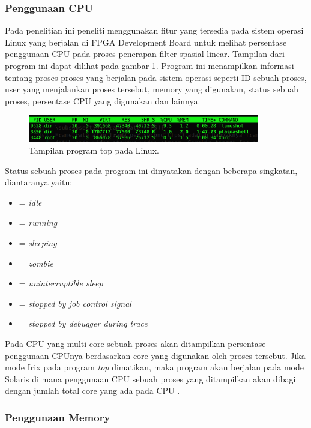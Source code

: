 \subsubsection{Penggunaan CPU}
Pada penelitian ini peneliti menggunakan fitur yang tersedia pada sistem operasi Linux yang berjalan di FPGA Development Board untuk melihat persentase penggunaan CPU pada proses penerapan filter spasial linear. Tampilan dari program ini dapat dilihat pada gambar \ref{fig:top}. Program ini menampilkan informasi tentang proses-proses yang berjalan pada sistem operasi seperti ID sebuah proses, user yang menjalankan proses tersebut, memory yang digunakan, status sebuah proses, persentase CPU yang digunakan dan lainnya.
\begin{figure}[H]
    \includegraphics[width=0.9\textwidth, center]{images/programs/top.png}
    \caption{Tampilan program top pada Linux.}
    \label{fig:top}
\end{figure}
Status sebuah proses pada program ini dinyatakan dengan beberapa singkatan, diantaranya yaitu:
\begin{itemize}[noitemsep, topsep=0pt]
    \item[]{ = \textit{idle}}
    \item[]{ = \textit{running}}
    \item[]{ = \textit{sleeping}}
    \item[]{ = \textit{zombie}}
    \item[]{ = \textit{uninterruptible sleep}}
    \item[]{ = \textit{stopped by job control signal}}
    \item[]{ = \textit{stopped by debugger during trace}}
  \end{itemize}

Pada CPU yang multi-core sebuah proses akan ditampilkan persentase penggunaan CPUnya berdasarkan core yang digunakan oleh proses tersebut. Jika mode Irix pada program \textit{top} dimatikan, maka program akan berjalan pada mode Solaris di mana penggunaan CPU sebuah proses yang ditampilkan akan dibagi dengan jumlah total core yang ada pada CPU .

\subsubsection{Penggunaan Memory}

